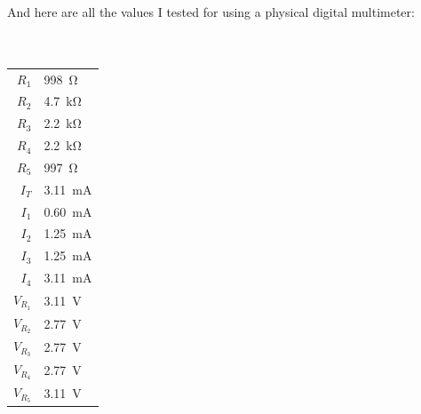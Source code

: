 \documentclass{article}
\begin{document}
\pagebreak

And here are all the values I tested for using a physical
digital multimeter:
\\
\\
\\
\begin{tabular}{r|l}
    $R_1$ & \SI{998}{\ohm}\\
    $R_2$ & \SI{4.7}{\kilo\ohm}\\
    $R_3$ & \SI{2.2}{\kilo\ohm}\\
    $R_4$ & \SI{2.2}{\kilo\ohm}\\
    $R_5$ & \SI{997}{\ohm}\\
    $I_T$ & \SI{3.11}{\milli\ampere}\\
    $I_1$ & \SI{0.60}{\milli\ampere}\\
    $I_2$ & \SI{1.25}{\milli\ampere}\\
    $I_3$ & \SI{1.25}{\milli\ampere}\\
    $I_4$ & \SI{3.11}{\milli\ampere}\\
    $V_{R_1}$ & \SI{3.11}{\volt}\\
    $V_{R_2}$ & \SI{2.77}{\volt}\\
    $V_{R_3}$ & \SI{2.77}{\volt}\\
    $V_{R_4}$ & \SI{2.77}{\volt}\\
    $V_{R_5}$ & \SI{3.11}{\volt}\\
\end{tabular}
\end{document}
